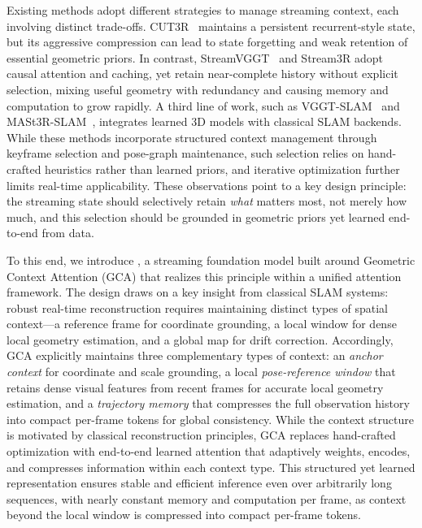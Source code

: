 Existing methods adopt different strategies to manage streaming context, each involving distinct trade-offs.
CUT3R~\cite{cut3r} maintains a persistent recurrent-style state, but its aggressive compression can lead to state forgetting and weak retention of essential geometric priors.
In contrast, StreamVGGT~\cite{streamVGGT} and Stream3R \cite{stream3r2025} adopt causal attention and caching, yet retain near-complete history without explicit selection, mixing useful geometry with redundancy and causing memory and computation to grow rapidly.
A third line of work, such as VGGT-SLAM~\cite{vggtslam} and MASt3R-SLAM~\cite{mast3rslam}, integrates learned 3D models with classical SLAM backends. While these methods incorporate structured context management through keyframe selection and pose-graph maintenance, such selection relies on hand-crafted heuristics rather than learned priors, and iterative optimization further limits real-time applicability.
These observations point to a key design principle: the streaming state should selectively retain \emph{what} matters most, not merely how much, and this selection should be grounded in geometric priors yet learned end-to-end from data.


To this end, we introduce \method, a streaming foundation model built around Geometric Context Attention (GCA) that realizes this principle within a unified attention framework.
The design draws on a key insight from classical SLAM systems: robust real-time reconstruction requires maintaining distinct types of spatial context---a reference frame for coordinate grounding, a local window for dense local geometry estimation, and a global map for drift correction.
Accordingly, GCA explicitly maintains three complementary types of context: an \emph{anchor context} for coordinate and scale grounding, a local \emph{pose-reference window} that retains dense visual features from recent frames for accurate local geometry estimation, and a \emph{trajectory memory} that compresses the full observation history into compact per-frame tokens for global consistency.
While the context structure is motivated by classical reconstruction principles, GCA replaces hand-crafted optimization with end-to-end learned attention that adaptively weights, encodes, and compresses information within each context type.
This structured yet learned representation ensures stable and efficient inference even over arbitrarily long sequences, with nearly constant memory and computation per frame, as context beyond the local window is compressed into compact per-frame tokens.






